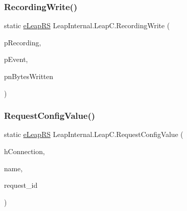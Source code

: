 \subsubsection{\texorpdfstring{RecordingWrite()}{RecordingWrite()}}
{\footnotesize\ttfamily static \mbox{\hyperlink{namespace_leap_internal_ae50b07d24c508b84273392b6dcbea1d9}{e\+Leap\+RS}} Leap\+Internal.\+Leap\+C.\+Recording\+Write (\begin{DoxyParamCaption}\item[{Int\+Ptr}]{p\+Recording,  }\item[{ref \mbox{\hyperlink{struct_leap_internal_1_1_l_e_a_p___t_r_a_c_k_i_n_g___e_v_e_n_t}{L\+E\+A\+P\+\_\+\+T\+R\+A\+C\+K\+I\+N\+G\+\_\+\+E\+V\+E\+NT}}}]{p\+Event,  }\item[{ref U\+Int64}]{pn\+Bytes\+Written }\end{DoxyParamCaption})}

\mbox{\label{class_leap_internal_1_1_leap_c_a9dd1b57cd651b609b45e8e476802f86b}} 
\subsubsection{\texorpdfstring{RequestConfigValue()}{RequestConfigValue()}}
{\footnotesize\ttfamily static \mbox{\hyperlink{namespace_leap_internal_ae50b07d24c508b84273392b6dcbea1d9}{e\+Leap\+RS}} Leap\+Internal.\+Leap\+C.\+Request\+Config\+Value (\begin{DoxyParamCaption}\item[{Int\+Ptr}]{h\+Connection,  }\item[{string}]{name,  }\item[{out U\+Int32}]{request\+\_\+id }\end{DoxyParamCaption})}

\mbox{\label{class_leap_internal_1_1_leap_c_a7483990e8538c017a4167fd7c2071c19}} 
